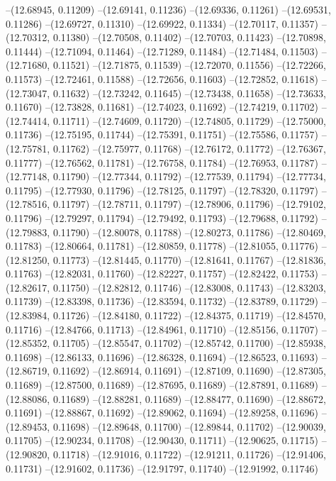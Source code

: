 --(12.68945, 0.11209)
--(12.69141, 0.11236)
--(12.69336, 0.11261)
--(12.69531, 0.11286)
--(12.69727, 0.11310)
--(12.69922, 0.11334)
--(12.70117, 0.11357)
--(12.70312, 0.11380)
--(12.70508, 0.11402)
--(12.70703, 0.11423)
--(12.70898, 0.11444)
--(12.71094, 0.11464)
--(12.71289, 0.11484)
--(12.71484, 0.11503)
--(12.71680, 0.11521)
--(12.71875, 0.11539)
--(12.72070, 0.11556)
--(12.72266, 0.11573)
--(12.72461, 0.11588)
--(12.72656, 0.11603)
--(12.72852, 0.11618)
--(12.73047, 0.11632)
--(12.73242, 0.11645)
--(12.73438, 0.11658)
--(12.73633, 0.11670)
--(12.73828, 0.11681)
--(12.74023, 0.11692)
--(12.74219, 0.11702)
--(12.74414, 0.11711)
--(12.74609, 0.11720)
--(12.74805, 0.11729)
--(12.75000, 0.11736)
--(12.75195, 0.11744)
--(12.75391, 0.11751)
--(12.75586, 0.11757)
--(12.75781, 0.11762)
--(12.75977, 0.11768)
--(12.76172, 0.11772)
--(12.76367, 0.11777)
--(12.76562, 0.11781)
--(12.76758, 0.11784)
--(12.76953, 0.11787)
--(12.77148, 0.11790)
--(12.77344, 0.11792)
--(12.77539, 0.11794)
--(12.77734, 0.11795)
--(12.77930, 0.11796)
--(12.78125, 0.11797)
--(12.78320, 0.11797)
--(12.78516, 0.11797)
--(12.78711, 0.11797)
--(12.78906, 0.11796)
--(12.79102, 0.11796)
--(12.79297, 0.11794)
--(12.79492, 0.11793)
--(12.79688, 0.11792)
--(12.79883, 0.11790)
--(12.80078, 0.11788)
--(12.80273, 0.11786)
--(12.80469, 0.11783)
--(12.80664, 0.11781)
--(12.80859, 0.11778)
--(12.81055, 0.11776)
--(12.81250, 0.11773)
--(12.81445, 0.11770)
--(12.81641, 0.11767)
--(12.81836, 0.11763)
--(12.82031, 0.11760)
--(12.82227, 0.11757)
--(12.82422, 0.11753)
--(12.82617, 0.11750)
--(12.82812, 0.11746)
--(12.83008, 0.11743)
--(12.83203, 0.11739)
--(12.83398, 0.11736)
--(12.83594, 0.11732)
--(12.83789, 0.11729)
--(12.83984, 0.11726)
--(12.84180, 0.11722)
--(12.84375, 0.11719)
--(12.84570, 0.11716)
--(12.84766, 0.11713)
--(12.84961, 0.11710)
--(12.85156, 0.11707)
--(12.85352, 0.11705)
--(12.85547, 0.11702)
--(12.85742, 0.11700)
--(12.85938, 0.11698)
--(12.86133, 0.11696)
--(12.86328, 0.11694)
--(12.86523, 0.11693)
--(12.86719, 0.11692)
--(12.86914, 0.11691)
--(12.87109, 0.11690)
--(12.87305, 0.11689)
--(12.87500, 0.11689)
--(12.87695, 0.11689)
--(12.87891, 0.11689)
--(12.88086, 0.11689)
--(12.88281, 0.11689)
--(12.88477, 0.11690)
--(12.88672, 0.11691)
--(12.88867, 0.11692)
--(12.89062, 0.11694)
--(12.89258, 0.11696)
--(12.89453, 0.11698)
--(12.89648, 0.11700)
--(12.89844, 0.11702)
--(12.90039, 0.11705)
--(12.90234, 0.11708)
--(12.90430, 0.11711)
--(12.90625, 0.11715)
--(12.90820, 0.11718)
--(12.91016, 0.11722)
--(12.91211, 0.11726)
--(12.91406, 0.11731)
--(12.91602, 0.11736)
--(12.91797, 0.11740)
--(12.91992, 0.11746)
